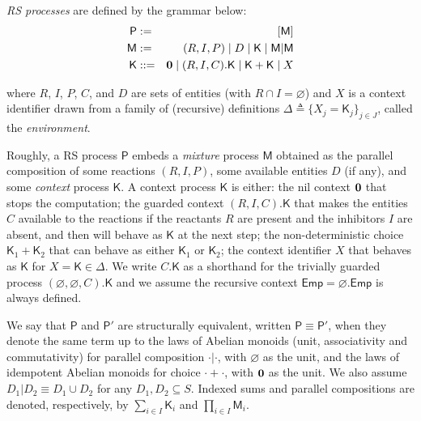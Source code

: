 \begin{definition}[RS processes]\label{def:LTSforRS}
\emph{RS processes} are defined by the grammar below:
\begin{eqnarray*}
\mathsf{P} & := & [\mathsf{M}]
\\
\mathsf{M} & := & (R,I,P) \mid D \mid \mathsf{K} \mid \mathsf{M}|\mathsf{M}
\\
\mathsf{K} & ::= & \mathbf{0} \mid (R,I,C).\mathsf{K} \mid \mathsf{K}+\mathsf{K} \mid X
\end{eqnarray*}

\noindent
where $R$, $I$, $P$, $C$, and $D$ are sets of entities (with $R\cap I=\varnothing$) and $X$ is a context identifier drawn from a family of (recursive) definitions $\Delta \triangleq\{X_j=\mathsf{K}_j\}_{j\in J}$, called the \emph{environment}.
\end{definition}

Roughly, a RS process  $\mathsf{P}$ embeds a \emph{mixture} process $\mathsf{M}$ obtained as the parallel composition of some reactions $(R,I,P)$, some available entities $D$ (if any), and some \emph{context} process $\mathsf{K}$.
A  context process $\mathsf{K}$ is either: 
the nil context $\mathbf{0}$ that stops the computation;
the guarded context $(R,I,C).\mathsf{K}$ that makes the entities $C$ available to the reactions if the reactants $R$ are present and the inhibitors $I$ are absent, and then will behave as $\mathsf{K}$ at the next step;
the non-deterministic choice $\mathsf{K}_1+\mathsf{K}_2$ that can behave as either  $\mathsf{K}_1$ or $\mathsf{K}_2$;  
the context identifier $X$ that behaves as $\mathsf{K}$ for $X=\mathsf{K}\in \Delta$.
We write $C.\mathsf{K}$ as a shorthand for the trivially guarded process $(\varnothing,\varnothing,C).\mathsf{K}$ and we assume the recursive context $\mathsf{Emp}=\varnothing.\mathsf{Emp}$ is always defined.


We say that $\mathsf{P}$ and $\mathsf{P}'$ are structurally equivalent, written $\mathsf{P} \equiv \mathsf{P}'$, when they denote the same term up to the laws of Abelian monoids (unit, associativity and commutativity) for  parallel composition $\cdot | \cdot$, with $\varnothing$ as the unit, and the laws of idempotent Abelian monoids for choice $\cdot +\cdot$, with $\mathbf{0}$ as the unit. We also assume $D_1 | D_2 \equiv D_1\cup D_2$ for any $D_1,D_2\subseteq S$.
Indexed sums and parallel compositions are denoted, respectively, by $\sum_{i\in I} \mathsf{K}_i$ and $\prod_{i\in I} \mathsf{M}_i$.


